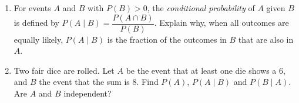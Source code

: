 \begin{enumerate}
\item[(a)] For events $A$ and $B$ with $P(B)>0$, the \emph{conditional probability} of $A$ given $B$ is defined by $P(A\mid B)=\dfrac{P(A\cap B)}{P(B)}$. Explain why, when all outcomes are equally likely, $P(A\mid B)$ is the fraction of the outcomes in $B$ that are also in $A$.
\item[(b)] Two fair dice are rolled. Let $A$ be the event that at least one die shows a $6$, and $B$ the event that the sum is $8$. Find $P(A)$, $P(A\mid B)$ and $P(B\mid A)$. Are $A$ and $B$ independent?
\end{enumerate}
